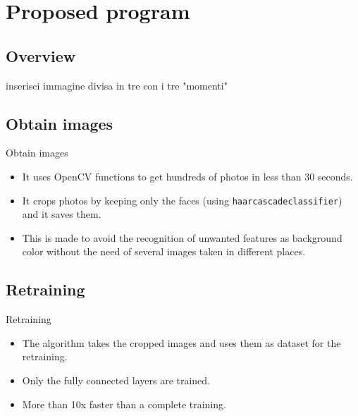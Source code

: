 \documentclass{beamer}
\begin{document}
\section{Proposed program}

\subsection{Overview}

\begin{frame}
inserisci immagine divisa in tre con i tre "momenti"
\end{frame}

\subsection{Obtain images}

\begin{frame}{Obtain images}
	\begin{itemize}
		\setlength\itemsep{1em}
		[triangle]

			\item 
				It uses OpenCV functions to get hundreds of photos in less than 30 seconds.
			\item 
				It crops photos by keeping only the faces (using \texttt{haarcascadeclassifier}) and it saves them.
			\item
				This is made to avoid the recognition of unwanted features as background color without 							the need of several images taken in different places.
		
	\end{itemize}
\end{frame}

\subsection{Retraining}

\begin{frame}{Retraining}
\begin{itemize}
		\setlength\itemsep{1em}
		[triangle]
		
			\item 
				The algorithm takes the cropped images and uses them as dataset for the retraining.
			\item 
				Only the fully connected layers are trained.
			\item
				More than 10x faster than a complete training.
		
	\end{itemize}
\end{frame}
\end{document}

